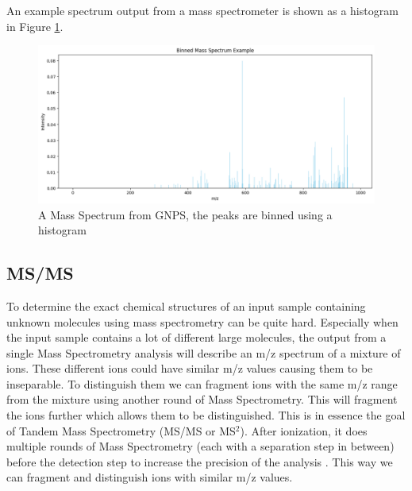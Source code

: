 An example spectrum output from a mass spectrometer is shown as a histogram in Figure \ref{fig:mass_spectrum_example}.

\begin{figure}[h]
    \centering
    \includegraphics[width=\linewidth]{figures/background/mass_spectrum_example.png}
    \caption{A Mass Spectrum from GNPS, the peaks are binned using a histogram}
    \label{fig:mass_spectrum_example}
\end{figure}

\subsection{\acf{MS/MS}}

To determine the exact chemical structures of an input sample containing unknown molecules using mass spectrometry can be quite hard. Especially when the input sample contains a lot of different large molecules, the output from a single Mass Spectrometry analysis will describe an m/z spectrum of a mixture of ions. These different ions could have similar m/z values causing them to be inseparable. To distinguish them we can fragment ions with the same m/z range from the mixture using another round of Mass Spectrometry. This will fragment the ions further which allows them to be distinguished. This is in essence the goal of Tandem Mass Spectrometry (\acs{MS/MS} or MS$^2$). After ionization, it does multiple rounds of Mass Spectrometry (each with a separation step in between) before the detection step to increase the precision of the analysis \cite{antoniewicz2013tandem, nationalmaglabtand}. This way we can fragment and distinguish ions with similar m/z values.

